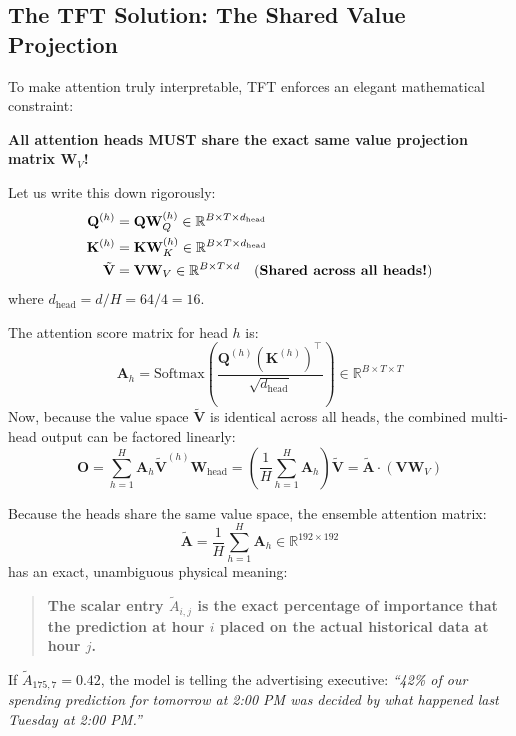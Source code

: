 \documentclass[11pt,a4paper]{article}
\begin{document}
\subsection{The TFT Solution: The Shared Value Projection}
To make attention truly interpretable, TFT enforces an elegant mathematical constraint:
\begin{center}
\textbf{All attention heads MUST share the exact same value projection matrix $\mathbf{W}_V$!}
\end{center}
Let us write this down rigorously:
\begin{align}
    \mathbf{Q}^{(h)} &= \mathbf{Q} \mathbf{W}_Q^{(h)} \in \mathbb{R}^{B \times T \times d_{\text{head}}} \\
    \mathbf{K}^{(h)} &= \mathbf{K} \mathbf{W}_K^{(h)} \in \mathbb{R}^{B \times T \times d_{\text{head}}} \\
    \tilde{\mathbf{V}} &= \mathbf{V} \mathbf{W}_V \in \mathbb{R}^{B \times T \times d} \quad \text{(\textbf{Shared across all heads!})}
\end{align}
where $d_{\text{head}} = d / H = 64 / 4 = 16$.

The attention score matrix for head $h$ is:
\begin{equation}
    \mathbf{A}_h = \mathrm{Softmax}\left(\frac{\mathbf{Q}^{(h)} (\mathbf{K}^{(h)})^\top}{\sqrt{d_{\text{head}}}}\right) \in \mathbb{R}^{B \times T \times T}
\end{equation}
Now, because the value space $\tilde{\mathbf{V}}$ is identical across all heads, the combined multi-head output can be factored linearly:
\begin{equation}
    \mathbf{O} = \sum_{h=1}^H \mathbf{A}_h \tilde{\mathbf{V}}^{(h)} \mathbf{W}_{\text{head}} = \left( \frac{1}{H} \sum_{h=1}^H \mathbf{A}_h \right) \tilde{\mathbf{V}} = \tilde{\mathbf{A}} \cdot \left(\mathbf{V} \mathbf{W}_V\right)
\end{equation}

\begin{intuitionbox}
Because the heads share the same value space, the ensemble attention matrix:
\begin{equation}
    \tilde{\mathbf{A}} = \frac{1}{H} \sum_{h=1}^H \mathbf{A}_h \in \mathbb{R}^{192 \times 192}
\end{equation}
has an exact, unambiguous physical meaning:
\begin{quote}
\textbf{The scalar entry $\tilde{A}_{i, j}$ is the exact percentage of importance that the prediction at hour $i$ placed on the actual historical data at hour $j$.}
\end{quote}
If $\tilde{A}_{175, 7} = 0.42$, the model is telling the advertising executive: \textit{``42\% of our spending prediction for tomorrow at 2:00 PM was decided by what happened last Tuesday at 2:00 PM.''}
\end{intuitionbox}
\end{document}
